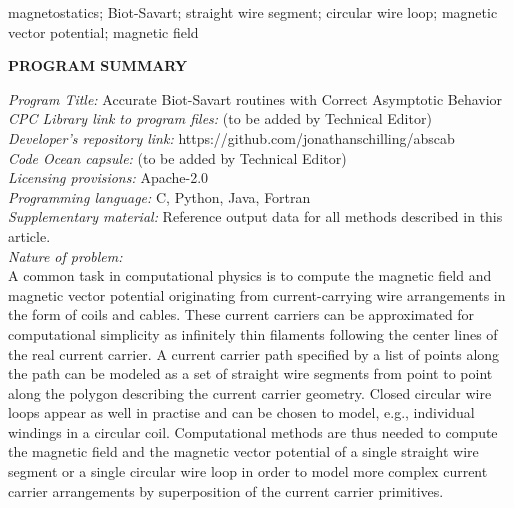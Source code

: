 \documentclass[preprint,12pt]{elsarticle}
\begin{document}
\begin{frontmatter}
\begin{keyword}
magnetostatics; Biot-Savart; straight wire segment; circular wire loop; magnetic vector potential; magnetic field
\end{keyword}

\end{frontmatter}



{\bf PROGRAM SUMMARY}

\begin{small}
\noindent
{\em Program Title:} Accurate Biot-Savart routines with Correct Asymptotic Behavior \\
{\em CPC Library link to program files:} (to be added by Technical Editor) \\
{\em Developer's repository link:} https://github.com/jonathanschilling/abscab \\
{\em Code Ocean capsule:} (to be added by Technical Editor)\\
{\em Licensing provisions:} Apache-2.0 \\
{\em Programming language:} C, Python, Java, Fortran \\
{\em Supplementary material:} Reference output data for all methods described in this article. \\
{\em Nature of problem:}\\
  A common task in computational physics is to compute the magnetic field and magnetic vector potential
  originating from current-carrying wire arrangements in the form of coils and cables.
  These current carriers can be approximated for computational simplicity as infinitely thin filaments
  following the center lines of the real current carrier.
  A current carrier path specified by a list of points along the path
  can be modeled as a set of straight wire segments from point to point along the polygon describing the current carrier geometry.
  Closed circular wire loops appear as well in practise and can be chosen to model, e.g.,
  individual windings in a circular coil.
  Computational methods are thus needed to compute the magnetic field and the magnetic vector potential
  of a single straight wire segment or a single circular wire loop
  in order to model more complex current carrier arrangements
  by superposition of the current carrier primitives. \\

\end{small}
\end{document}
